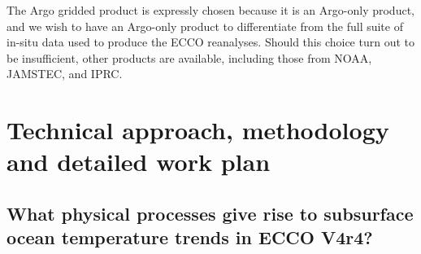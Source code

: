 \documentclass[authoryear,round,12pt]{article}
\begin{document}

The Argo gridded product is expressly chosen because it is an Argo-only product, and we wish to have an Argo-only product to differentiate from the full suite of in-situ data used to produce the ECCO reanalyses. Should this choice turn out to be insufficient, other products are available, including those from NOAA, JAMSTEC, and IPRC.



\section{Technical approach, methodology and detailed work plan}



\subsection{What physical processes give rise to subsurface ocean temperature trends in ECCO V4r4?}
\end{document}
